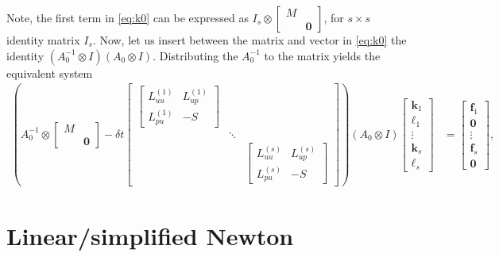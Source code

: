 \documentclass[a4paper,10pt]{article}
\begin{document}
Note, the first term in \eqref{eq:k0} can be expressed as
$I_s \otimes \begin{bmatrix} M \\ & \mathbf{0}\end{bmatrix}$, for $s\times s$
identity matrix $I_s$. Now, let us insert between the matrix and vector in
\eqref{eq:k0} the identity $(A_0^{-1}\otimes I)(A_0\otimes I)$. Distributing the
$A_0^{-1}$ to the matrix yields the equivalent system
%
\begin{align}\label{eq:k1}
\left(A_0^{-1} \otimes \begin{bmatrix} M \\ & \mathbf{0}\end{bmatrix}
	- \delta t \begin{bmatrix} \begin{bmatrix} L^{(1)}_{uu} & L^{(1)}_{up} \\ L^{(1)}_{pu} & -S \end{bmatrix} & \\
	\ & \ddots & \ \\ & & \begin{bmatrix} L^{(s)}_{uu} & L^{(s)}_{up} \\ L^{(s)}_{pu} & -S \end{bmatrix} \end{bmatrix} \right)
	(A_0\otimes I)\begin{bmatrix} \mathbf{k}_1 \\ \ell_1 \\ \vdots \\ \mathbf{k}_s \\ \ell_s\end{bmatrix} 
& = \begin{bmatrix} \mathbf{f}_1 \\ \mathbf{0} \\ \vdots \\ \mathbf{f}_s \\ \mathbf{0} \end{bmatrix},
\end{align}
%


\section{Linear/simplified Newton}
\end{document}
